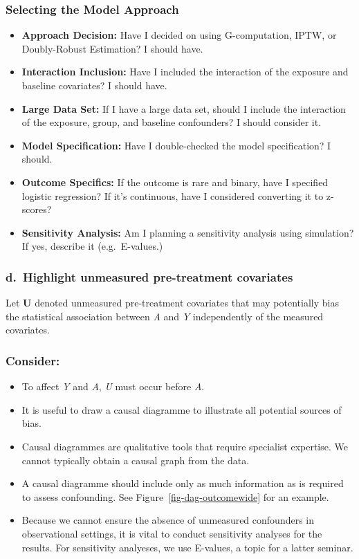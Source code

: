 \documentclass[
  singlecolumn]{article}
\providecommand{\tightlist}{%
  \setlength{\itemsep}{0pt}\setlength{\parskip}{0pt}}\usepackage{longtable,booktabs,array}
\begin{document}
\subsubsection{Selecting the Model
Approach}\label{selecting-the-model-approach}

\begin{itemize}
\tightlist
\item
  \textbf{Approach Decision:} Have I decided on using G-computation,
  IPTW, or Doubly-Robust Estimation? I should have.
\item
  \textbf{Interaction Inclusion:} Have I included the interaction of the
  exposure and baseline covariates? I should have.
\item
  \textbf{Large Data Set:} If I have a large data set, should I include
  the interaction of the exposure, group, and baseline confounders? I
  should consider it.
\item
  \textbf{Model Specification:} Have I double-checked the model
  specification? I should.
\item
  \textbf{Outcome Specifics:} If the outcome is rare and binary, have I
  specified logistic regression? If it's continuous, have I considered
  converting it to z-scores?
\item
  \textbf{Sensitivity Analysis:} Am I planning a sensitivity analysis
  using simulation? If yes, describe it (e.g.~E-values.)
\end{itemize}

\subsubsection{d.~Highlight unmeasured pre-treatment
covariates}\label{d.-highlight-unmeasured-pre-treatment-covariates}

Let \textbf{U} denoted unmeasured pre-treatment covariates that may
potentially bias the statistical association between \emph{A} and
\emph{Y} independently of the measured covariates.

\subsubsection{Consider:}\label{consider}

\begin{itemize}
\tightlist
\item
  To affect \emph{Y} and \emph{A}, \emph{U} must occur before \emph{A}.
\item
  It is useful to draw a causal diagramme to illustrate all potential
  sources of bias.
\item
  Causal diagrammes are qualitative tools that require specialist
  expertise. We cannot typically obtain a causal graph from the data.
\item
  A causal diagramme should include only as much information as is
  required to assess confounding. See Figure~\ref{fig-dag-outcomewide}
  for an example.
\item
  Because we cannot ensure the absence of unmeasured confounders in
  observational settings, it is vital to conduct sensitivity analyses
  for the results. For sensitivity analyeses, we use E-values, a topic
  for a latter seminar.
\end{itemize}
\end{document}
